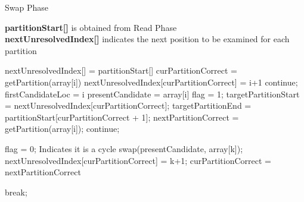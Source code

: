 \begin{algorithm}[h!]
\small
\caption{Swap Phase}
\label{alg:swap_phase}
\textbf{partitionStart[]} is obtained from Read Phase\\
\textbf{nextUnresolvedIndex[]} indicates the next position to be examined for each partition\\
\begin{algorithmic}[1]
\State nextUnresolvedIndex[] = partitionStart[]
	\State curPartitionCorrect = getPartition(array[i])
     \State nextUnresolvedIndex[curPartitionCorrect] = i+1
	\State continue;
     \Else
     		\State firstCandidateLoc = i
			\State presentCandidate = array[i]             
            \State flag = 1;
                \State targetPartitionStart = nextUnresolvedIndex[curPartitionCorrect];
                \State targetPartitionEnd = partitionStart[curPartitionCorrect + 1];
                \State nextPartitionCorrect = getPartition(array[i]);
                        \State continue;
                        
                        \State flag = 0; \Comment Indicates it is a cycle
                    \EndIf
                    \State swap(presentCandidate, array[k]);
                    \State nextUnresolvedIndex[curPartitionCorrect] = k+1;
                    \State curPartitionCorrect = nextPartitionCorrect
                    
                    \State break;
             
				\EndFor
			\EndWhile
	\EndIf
\EndFor
{}
\end{algorithmic}

\end{algorithm}